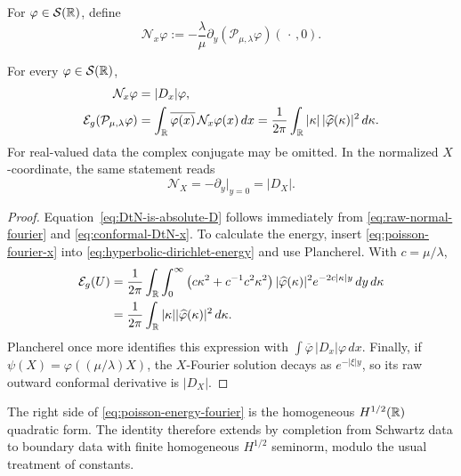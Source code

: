 \begin{definition}
\label{def:conformal-DtN}
For $\varphi\in\mathcal S(\mathbb{R})$, define
\begin{equation}\label{eq:conformal-DtN-x}
 \mathcal N_x\varphi
 :=-\frac{\lambda}{\mu}
   \partial_y(\mathcal P_{\mu,\lambda}\varphi)(\,\cdot\,,0).
\end{equation}
\end{definition}

\begin{theorem}
\label{thm:DtN-energy-identity}
For every $\varphi\in\mathcal S(\mathbb{R})$,
\begin{align}
 \mathcal N_x\varphi&=|D_x|\varphi,
 \label{eq:DtN-is-absolute-D}\\
 \mathcal E_g(\mathcal P_{\mu,\lambda}\varphi)
 &=\int_{\mathbb{R}}\overline{\varphi(x)}\,
       \mathcal N_x\varphi(x)\,dx
  =\frac1{2\pi}\int_{\mathbb{R}}
       |\kappa|\,|\widehat\varphi(\kappa)|^2\,d\kappa.
 \label{eq:poisson-energy-fourier}
\end{align}
For real-valued data the complex conjugate may be omitted.  In the normalized
$X$-coordinate, the same statement reads
\[
 \mathcal N_X=-\partial_y\big|_{y=0}=|D_X|.
\]
\end{theorem}

\begin{proof}
Equation~\eqref{eq:DtN-is-absolute-D} follows immediately from
\eqref{eq:raw-normal-fourier} and
\eqref{eq:conformal-DtN-x}.  To calculate the energy, insert
\eqref{eq:poisson-fourier-x} into
\eqref{eq:hyperbolic-dirichlet-energy} and use Plancherel.  With
$c=\mu/\lambda$,
\begin{align*}
 \mathcal E_g(U)
 &=\frac1{2\pi}\int_{\mathbb{R}}\int_0^\infty
   \left(c\kappa^2+c^{-1}c^2\kappa^2\right)
   |\widehat\varphi(\kappa)|^2e^{-2c|\kappa|y}
   \,dy\,d\kappa\\
 &=\frac1{2\pi}\int_{\mathbb{R}}|\kappa|
   |\widehat\varphi(\kappa)|^2\,d\kappa.
\end{align*}
Plancherel once more identifies this expression with
$\int\overline\varphi\,|D_x|\varphi\,dx$.  Finally, if
$\psi(X)=\varphi((\mu/\lambda)X)$, the $X$-Fourier solution decays as
$e^{-|\xi|y}$, so its raw outward conformal derivative is $|D_X|$.
\end{proof}

The right side of \eqref{eq:poisson-energy-fourier} is the homogeneous
$H^{1/2}(\mathbb{R})$ quadratic form.  The identity therefore extends by completion
from Schwartz data to boundary data with finite homogeneous
$H^{1/2}$ seminorm, modulo the usual treatment of constants.

